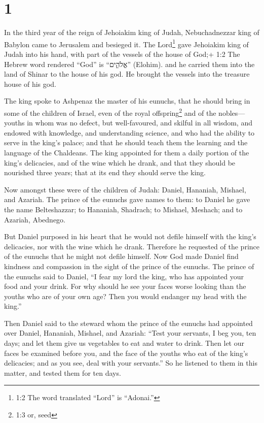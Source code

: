 \hypertarget{section}{%
\section{1}\label{section}}

 In the third year of the reign of Jehoiakim king of Judah,
Nebuchadnezzar king of Babylon came to Jerusalem and besieged it.
 The Lord\footnote{1:2 The word translated ``Lord'' is
  ``Adonai.''} gave Jehoiakim king of Judah into his hand, with part of
the vessels of the house of God;+ 1:2 The Hebrew word rendered ``God''
is ``אֱלֹהִ֑ים'' (Elohim). and he carried them into the land of Shinar
to the house of his god. He brought the vessels into the treasure house
of his god.

 The king spoke to Ashpenaz the master of his eunuchs, that
he should bring in some of the children of Israel, even of the royal
offspring\footnote{1:3 or, seed} and of the nobles--- 
youths in whom was no defect, but well-favoured, and skilful in all
wisdom, and endowed with knowledge, and understanding science, and who
had the ability to serve in the king's palace; and that he should teach
them the learning and the language of the Chaldeans.  The
king appointed for them a daily portion of the king's delicacies, and of
the wine which he drank, and that they should be nourished three years;
that at its end they should serve the king.

 Now amongst these were of the children of Judah: Daniel,
Hananiah, Mishael, and Azariah.  The prince of the eunuchs
gave names to them: to Daniel he gave the name Belteshazzar; to
Hananiah, Shadrach; to Mishael, Meshach; and to Azariah, Abednego.

 But Daniel purposed in his heart that he would not defile
himself with the king's delicacies, nor with the wine which he drank.
Therefore he requested of the prince of the eunuchs that he might not
defile himself.  Now God made Daniel find kindness and
compassion in the sight of the prince of the eunuchs.  The
prince of the eunuchs said to Daniel, ``I fear my lord the king, who has
appointed your food and your drink. For why should he see your faces
worse looking than the youths who are of your own age? Then you would
endanger my head with the king.''

 Then Daniel said to the steward whom the prince of the
eunuchs had appointed over Daniel, Hananiah, Mishael, and Azariah:
 ``Test your servants, I beg you, ten days; and let them
give us vegetables to eat and water to drink.  Then let our
faces be examined before you, and the face of the youths who eat of the
king's delicacies; and as you see, deal with your servants.''
 So he listened to them in this matter, and tested them for
ten days.

